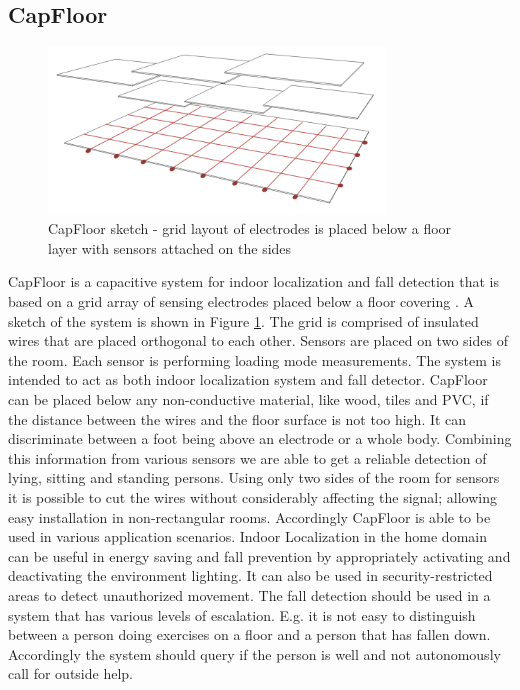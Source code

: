 \subsection{CapFloor}
\begin{figure}[h]
\centering
\includegraphics[width=0.8\textwidth]{images/capfloor}
\caption{CapFloor sketch - grid layout of electrodes is placed below a floor layer with sensors attached on the sides}
\label{fig:capfloor_sketch}
\end{figure}

CapFloor is a capacitive system for indoor localization and fall detection that is based on a grid array of sensing electrodes placed below a floor covering \cite{Braun2012CapFloor}. A sketch of the system is shown in Figure \ref{fig:capfloor_sketch}. The grid is comprised of insulated wires that are placed orthogonal to each other. Sensors are placed on two sides of the room. Each sensor is performing loading mode measurements. The system is intended to act as both indoor localization system and fall detector. CapFloor can be placed below any non-conductive material, like wood, tiles and PVC, if the distance between the wires and the floor surface is not too high. It can discriminate between a foot being above an electrode or a whole body. Combining this information from various sensors we are able to get a reliable detection of lying, sitting and standing persons. Using only two sides of the room for sensors it is possible to cut the wires without considerably affecting the signal; allowing easy installation in non-rectangular rooms.
Accordingly CapFloor is able to be used in various application scenarios. Indoor Localization in the home domain can be useful in energy saving and fall prevention by appropriately activating and deactivating the environment lighting. It can also be used in security-restricted areas to detect unauthorized movement. The fall detection should be used in a system that has various levels of escalation. E.g. it is not easy to distinguish between a person doing exercises on a floor and a person that has fallen down. Accordingly the system should query if the person is well and not autonomously call for outside help.

